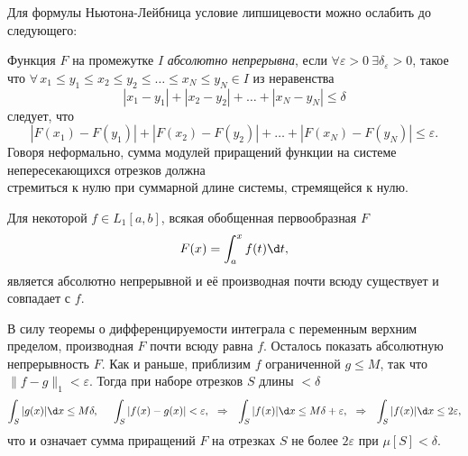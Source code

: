 
Для формулы Ньютона-Лейбница условие липшицевости можно ослабить до следующего:

\begin{to_def}
    Функция $F$ на промежутке $I$ \textit{абсолютно непрерывна}, если $\forall \varepsilon > 0 \ \exists \delta_\varepsilon > 0$, такое что
    $\forall \, x_1 \leq y_1 \leq x_2 \leq y_2 \leq \ldots \leq x_N \leq y_N \in I$ из неравенства
    \begin{equation*}
        |x_1 - y_1| + |x_2 - y_2| + \ldots + |x_N - y_N| \leq \delta
    \end{equation*}
    следует, что
    \begin{equation*}
        |F(x_1)-F(y_1)| + 
        |F(x_2)-F(y_2)| + 
        \ldots +
        |F(x_N)-F(y_N)| \leq \varepsilon.
    \end{equation*}
    Говоря неформально, сумма модулей приращений функции на системе непересекающихся отрезков должна \\ стремиться к нулю при суммарной длине системы, стремящейся к нулю.
\end{to_def}


\begin{to_thr}[]
    Для некоторой $f \in L_1 [a, b]$, всякая обобщенная первообразная $F$ 
    \begin{equation*}
        F(x) = \int_a^x f(t) \d t,
    \end{equation*}
     является абсолютно непрерывной и её производная почти всюду существует и совпадает с $f$. 
\end{to_thr}

\begin{uproof}
    В силу теоремы о дифференцируемости интеграла с переменным верхним пределом, производная $F$ почти всюду равна $f$. Осталось показать абсолютную непрерывность $F$. Как и раньше, приблизим $f$ ограниченной $g \leq M$, так что $\|f-g\|_1 < \varepsilon$. Тогда при наборе отрезков $S$ длины $< \delta$
     \begin{equation*}
         \int_S |g(x)| \d x \leq M \delta, \hspace{5 mm} 
         \int_S |f(x) - g(x)| < \varepsilon,
         \hspace{0.25cm} \Rightarrow \hspace{0.25cm}
        \int_S |f(x)| \d x \leq M \delta  + \varepsilon,
        \hspace{0.25cm} \Rightarrow \hspace{0.25cm}
        \int_S |f(x)| \d x \leq 2 \varepsilon,
     \end{equation*}
     что и означает сумма приращений $F$ на отрезках $S$ не более $2\varepsilon$ при $\mu[S] < \delta$. 
\end{uproof}



